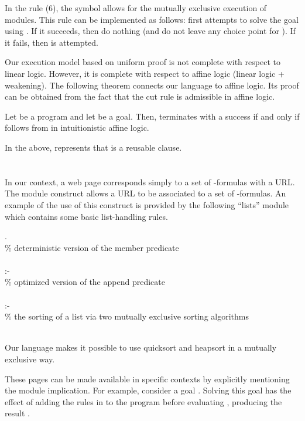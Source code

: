 \documentclass[12pt]{article}
\begin{document}
\noindent  
In the rule (6), the symbol   allows for the mutually exclusive execution of modules. This rule
 can be implemented as follows:
  first attempts to solve the goal using .
 If it succeeds, then do nothing (and do not leave any choice point for 
). If it fails, then  is attempted. 

Our execution model based on uniform proof is not complete with respect to linear logic.
However, it is complete with respect to affine logic (linear logic + weakening).
The following theorem connects our language to affine logic.
Its proof can be obtained from the fact that the cut rule is admissible in affine logic.

\begin{theorem}
 Let  be a program and 
let  be a goal.  Then,  terminates with a success
 if and only if  follows from
 in intuitionistic affine logic. 
\end{theorem}
\noindent In the above,  represents that  is  a reusable clause.


\section{\hweb}\label{sec:modules}

In our context, a web page corresponds simply to a set of -formulas
 with a URL. 
The module construct  allows a URL to be associated to a set of -formulas.
An example of the use of this construct is provided by the 
following ``lists'' module which contains some basic list-handling rules.


\begin{exmple}
 .\\
\%  deterministic version of the member predicate \\
\\
 {\rm :-}  \\
\%  optimized version of the append predicate \\
 \\
 {\rm :-}   \\ 

\% the sorting of a list via two mutually exclusive sorting algorithms \\
\\
\end{exmple}
\noindent Our language  makes it possible to use quicksort and heapsort in a mutually exclusive way.

 These  pages can be made available in specific contexts by explicitly
mentioning the module implication. For example, consider a goal 
. 
Solving this goal  has the effect
 of adding the rules in 
to the program before evaluating , producing the result .
\end{document}
